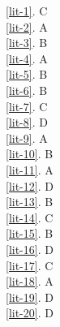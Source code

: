 \noindent \ref{lit-1}. C\\
\ref{lit-2}. A\\
\ref{lit-3}. B\\
\ref{lit-4}. A\\ 
\ref{lit-5}. B \\
\ref{lit-6}. B\\
\ref{lit-7}. C\\
\ref{lit-8}. D\\
\ref{lit-9}. A \\ 
\ref{lit-10}. B\\
\ref{lit-11}. A\\
\ref{lit-12}. D\\
\ref{lit-13}. B\\
\ref{lit-14}. C\\
\ref{lit-15}. B\\
\ref{lit-16}. D\\
\ref{lit-17}. C\\
\ref{lit-18}. A\\
\ref{lit-19}. D\\
\ref{lit-20}. D\\

